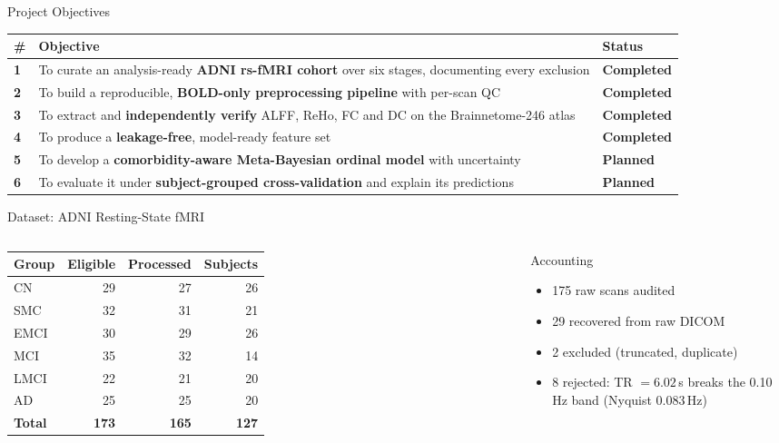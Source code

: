 \documentclass[aspectratio=169,11pt]{beamer}
\newcommand{\done}{\textcolor{DoneGreen}{\textbf{Completed}}}
\newcommand{\planned}{\textcolor{PlanOrange}{\textbf{Planned}}}
\begin{document}
\begin{frame}{Project Objectives}
  \small
  \renewcommand{\arraystretch}{1.35}
  \begin{tabularx}{\textwidth}{>{\bfseries}p{0.4cm}X>{\centering\arraybackslash}p{2.0cm}}
    \toprule
    \# & \textbf{Objective} & \textbf{Status}\\
    \midrule
    1 & To curate an analysis-ready \textbf{ADNI rs-fMRI cohort} over six stages, documenting every exclusion & \done\\
    2 & To build a reproducible, \textbf{BOLD-only preprocessing pipeline} with per-scan QC & \done\\
    3 & To extract and \textbf{independently verify} ALFF, ReHo, FC and DC on the Brainnetome-246 atlas & \done\\
    4 & To produce a \textbf{leakage-free}, model-ready feature set & \done\\
    5 & To develop a \textbf{comorbidity-aware Meta-Bayesian ordinal model} with uncertainty & \planned\\
    6 & To evaluate it under \textbf{subject-grouped cross-validation} and explain its predictions & \planned\\
    \bottomrule
  \end{tabularx}
\end{frame}

\begin{frame}{Dataset: ADNI Resting-State fMRI}
  \begin{columns}[T,onlytextwidth]
      \small
      \begin{tabular}{lrrr}
        \toprule
        \textbf{Group} & \textbf{Eligible} & \textbf{Processed} & \textbf{Subjects}\\
        \midrule
        CN   & 29 & 27 & 26\\
        SMC  & 32 & 31 & 21\\
        EMCI & 30 & 29 & 26\\
        MCI  & 35 & 32 & 14\\
        LMCI & 22 & 21 & 20\\
        AD   & 25 & 25 & 20\\
        \midrule
        \textbf{Total} & \textbf{173} & \textbf{165} & \textbf{127}\\
        \bottomrule
      \end{tabular}
      \begin{block}{Accounting}
        \small
        \begin{itemize}
          \item 175 raw scans audited
          \item 29 recovered from raw DICOM
          \item 2 excluded (truncated, duplicate)
          \item 8 rejected: TR $=6.02$\,s breaks the 0.10\,Hz band (Nyquist 0.083\,Hz)
        \end{itemize}
      \end{block}
  \end{columns}
\end{frame}
\end{document}
